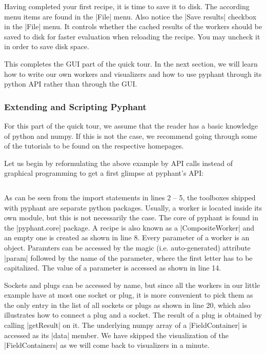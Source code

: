 \documentclass[a4paper]{article}
\begin{document}
Having completed your first recipe, it is time to save it to
disk. The according menu items are found in the |File| menu. Also
notice the |Save results| checkbox in the |File| menu. It controls
whether the cached results of the workers should be saved to disk for
faster evaluation when reloading the recipe. You may uncheck it in
order to save disk space.

This completes the GUI part of the quick tour. In the next section, we
will learn how to write our own workers and visualizers and how to use
pyphant through its python API rather than through the GUI.

\FloatBarrier
\subsubsection{Extending and Scripting Pyphant}
\label{sec:introduction_extending_and_scripting}

For this part of the quick tour, we assume that the reader has a basic
knowledge of python\cite{python} and numpy\cite{numpy}. If this is not
the case, we recommend going through some of the tutorials to be found
on the respective homepages.

Let us begin by reformulating the above example by API calls instead
of graphical programming to get a first glimpse at pyphant's API:

\inputminted[linenos]{python}{api001.py}

As can be seen from the import statements in lines 2 -- 5, the
toolboxes shipped with pyphant are separate python packages. Usually,
a worker is located inside its own module, but this is not necessarily
the case. The core of pyphant is found in the |pyphant.core|
package. A recipe is also known as a |CompositeWorker| and an empty
one is created as shown in line 8. Every parameter of a worker is an
object. Paramters can be accessed by the magic (i.e. auto-generated)
attribute |param| followed by the name of the parameter, where the
first letter has to be capitalized. The value of a parameter is
accessed as shown in line 14.

Sockets and plugs can be accessed by name, but since all the workers
in our little example have at most one socket or plug, it is more
convenient to pick them as the only entry in the list of all sockets
or plugs as shown in line 20, which also illustrates how to connect a
plug and a socket. The result of a plug is obtained by calling
|getResult| on it. The underlying numpy array of a |FieldContainer| is
accessed as its |data| member. We have skipped the visualization of
the |FieldContainers| as we will come back to visualizers in a minute.
\end{document}

